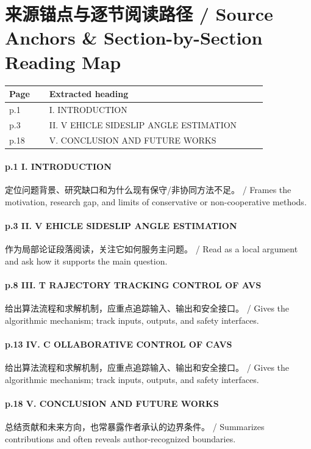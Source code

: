 \documentclass[UTF8,a4paper,11pt,fontset=fandol]{ctexart}
\begin{document}
\section{来源锚点与逐节阅读路径 / Source Anchors \& Section-by-Section Reading Map}
\begin{longtable}{p{0.14\linewidth}p{0.76\linewidth}}
\toprule
Page & Extracted heading\\
\midrule
p.1 & I. INTRODUCTION \\
p.3 & II. V EHICLE SIDESLIP ANGLE ESTIMATION \\
p.18 & V. CONCLUSION AND FUTURE WORKS \\
\bottomrule
\end{longtable}

\paragraph{p.1 I. INTRODUCTION}定位问题背景、研究缺口和为什么现有保守/非协同方法不足。 / Frames the motivation, research gap, and limits of conservative or non-cooperative methods.

\paragraph{p.3 II. V EHICLE SIDESLIP ANGLE ESTIMATION}作为局部论证段落阅读，关注它如何服务主问题。 / Read as a local argument and ask how it supports the main question.

\paragraph{p.8 III. T RAJECTORY TRACKING CONTROL OF AVS}给出算法流程和求解机制，应重点追踪输入、输出和安全接口。 / Gives the algorithmic mechanism; track inputs, outputs, and safety interfaces.

\paragraph{p.13 IV. C OLLABORATIVE CONTROL OF CAVS}给出算法流程和求解机制，应重点追踪输入、输出和安全接口。 / Gives the algorithmic mechanism; track inputs, outputs, and safety interfaces.

\paragraph{p.18 V. CONCLUSION AND FUTURE WORKS}总结贡献和未来方向，也常暴露作者承认的边界条件。 / Summarizes contributions and often reveals author-recognized boundaries.
\end{document}
